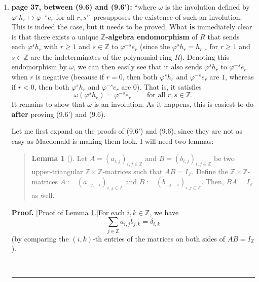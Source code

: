 \documentclass[numbers=enddot,12pt,final,onecolumn,notitlepage]{scrartcl}%
\newenvironment{statement}{\begin{quote}}{\end{quote}}
\theoremstyle{definition}
\newtheorem{lem}[theo]{Lemma}
\newenvironment{lemmain}[1][]
{\begin{statement}\begin{lem}[#1]}
{\end{lem}\end{statement}}
\newenvironment{proof}[1][Proof]{\noindent\textbf{#1.} }{\ \rule{0.5em}{0.5em}}
\newenvironment{lemmain}[1][Proof]{\noindent\textbf{#1.} }{\ \rule{0.5em}{0.5em}}
\let\sumnonlimits\sum
\renewcommand{\sum}{\sumnonlimits\limits}
\begin{document}
\begin{enumerate}
\item \textbf{page 37, between (9.6) and (9.6'):} \textquotedblleft where
$\omega$ is the involution defined by $\varphi^{s}h_{r}\mapsto\varphi
^{-s}e_{r}$ for all $r,s$\textquotedblright\ presupposes the existence of such
an involution. This is indeed the case, but it needs to be proved. What
\textbf{is} immediately clear is that there exists a unique $\mathbb{Z}%
$\textbf{-algebra endomorphism} of $R$ that sends each $\varphi^{s}h_{r}$ with
$r\geq1$ and $s\in\mathbb{Z}$ to $\varphi^{-s}e_{r}$ (since the $\varphi
^{s}h_{r}=h_{r,s}$ for $r\geq1$ and $s\in\mathbb{Z}$ are the indeterminates of
the polynomial ring $R$). Denoting this endomorphism by $\omega$, we can then
easily see that it also sends $\varphi^{s}h_{r}$ to $\varphi^{-s}e_{r}$ when
$r$ is negative (because if $r=0$, then both $\varphi^{s}h_{r}$ and
$\varphi^{-s}e_{r}$ are $1$, whereas if $r<0$, then both $\varphi^{s}h_{r}$
and $\varphi^{-s}e_{r}$ are $0$). That is, it satisfies%
\begin{equation}
\omega\left(  \varphi^{s}h_{r}\right)  =\varphi^{-s}e_{r}%
\ \ \ \ \ \ \ \ \ \ \text{for all }r,s\in\mathbb{Z}. \label{p37.omg}%
\end{equation}
It remains to show that $\omega$ is an involution. As it happens, this is
easiest to do \textbf{after} proving (9.6') and (9.6).

Let me first expand on the proofs of (9.6') and (9.6), since they are not as
easy as Macdonald is making them look. I will need two lemmas:

\begin{lemmain}
\label{lem.matprod.-180}Let $A=\left(  a_{i,j}\right)  _{i,j\in\mathbb{Z}}$
and $B=\left(  b_{i,j}\right)  _{i,j\in\mathbb{Z}}$ be two upper-triangular
$\mathbb{Z}\times\mathbb{Z}$-matrices such that $AB=I_{\mathbb{Z}}$. Define
the $\mathbb{Z}\times\mathbb{Z}$-matrices $\widetilde{A}:=\left(
a_{-j,-i}\right)  _{i,j\in\mathbb{Z}}$ and $\widetilde{B}:=\left(
b_{-j,-i}\right)  _{i,j\in\mathbb{Z}}$. Then, $\widetilde{B}\widetilde{A}%
=I_{\mathbb{Z}}$ as well.
\end{lemmain}

\begin{proof}
[Proof of Lemma \ref{lem.matprod.-180}.]For each $i,k\in\mathbb{Z}$, we have%
\begin{equation}
\sum_{j\in\mathbb{Z}}a_{i,j}b_{j,k}=\delta_{i,k} \label{pf.lem.matprod.-180.1}%
\end{equation}
(by comparing the $\left(  i,k\right)  $-th entries of the matrices on both
sides of $AB=I_{\mathbb{Z}}$).


\end{proof}
\end{enumerate}
\end{document}
